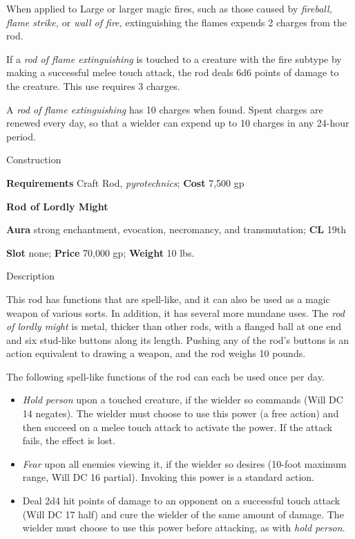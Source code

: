 When applied to Large or larger magic fires, such as those caused by \textit{fireball, flame strike, }or \textit{wall of fire, }extinguishing the flames expends 2 charges from the rod.
				
If a \textit{rod of flame extinguishing} is touched to a creature with the fire subtype by making a successful melee touch attack, the rod deals 6d6 points of damage to the creature. This use requires 3 charges.
				
A \textit{rod of flame extinguishing} has 10 charges when found. Spent charges are renewed every day, so that a wielder can expend up to 10 charges in any 24-hour period. 
				
Construction
				
\textbf{Requirements} Craft Rod, \textit{pyrotechnics}; \textbf{Cost }7,500 gp
				
\textbf{Rod of Lordly Might}
				
\textbf{Aura} strong enchantment, evocation, necromancy, and transmutation;\textbf{ CL }19th
				
\textbf{Slot} none; \textbf{Price} 70,000 gp; \textbf{Weight} 10 lbs.
				
Description
				
This rod has functions that are spell-like, and it can also be used as a magic weapon of various sorts. In addition, it has several more mundane uses. The \textit{rod of lordly might }is metal, thicker than other rods, with a flanged ball at one end and six stud-like buttons along its length. Pushing any of the rod's buttons is an action equivalent to drawing a weapon, and the rod weighs 10 pounds.
				
The following spell-like functions of the rod can each be used once per day.
				\begin{itemize}\item  \textit{Hold person} upon a touched creature, if the wielder so commands (Will DC 14 negates). The wielder must choose to use this power (a free action) and then succeed on a melee touch attack to activate the power. If the attack fails, the effect is lost.
				\item  \textit{Fear} upon all enemies viewing it, if the wielder so desires (10-foot maximum range, Will DC 16 partial). Invoking this power is a standard action.
				\item  Deal 2d4 hit points of damage to an opponent on a successful touch attack (Will DC 17 half) and cure the wielder of the same amount of damage. The wielder must choose to use this power before attacking, as with \textit{hold person}.
\end{itemize}
				
